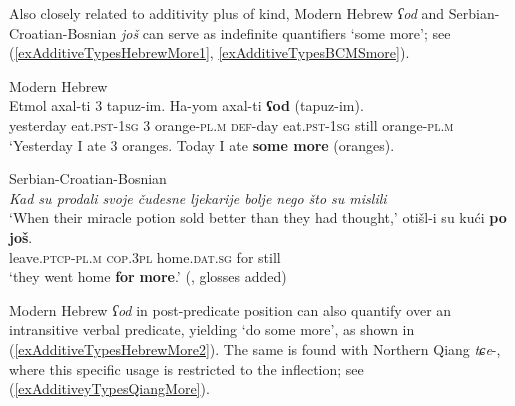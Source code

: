 Also closely related to additivity plus  of kind, Modern Hebrew \textit{ʕod} and Serbian-Croatian-Bosnian \textit{još} can serve as indefinite quantifiers \lq some more\rq{}; see (\ref{exAdditiveTypesHebrewMore1}, \ref{exAdditiveTypesBCMSmore}).

\begin{exe}
	\ex Modern Hebrew\label{exAdditiveTypesHebrewMore1}\\
	\gll Etmol axal-ti 3 tapuz-im. Ha-yom axal-ti \textbf{ʕod} \textup{(}tapuz-im\textup{)}.\\
	yesterday eat.\textsc{pst}-1\textsc{sg} 3 orange-\textsc{pl}.\textsc{m} \textsc{def}-day eat.\textsc{pst}-1\textsc{sg} still \phantom{(}orange-\textsc{pl}.\textsc{m}\\
	\glt \lq Yesterday I ate 3 oranges. Today I ate \textbf{some more} (oranges).
	\\\parencite[127]{Greenberg2012}

	\ex Serbian-Croatian-Bosnian\label{exAdditiveTypesBCMSmore}\\
	\textit{Kad su prodali svoje čudesne ljekarije bolje nego što su mislili}\\
	\lq When their miracle potion sold better than they had thought,\rq{}
	\exi{}\gll otišl-i su kući \textbf{po} \textbf{još}.\\
	leave.\textsc{ptcp}-\textsc{pl}.\textsc{m} \textsc{cop}.3\textsc{pl} home.\textsc{dat}.\textsc{sg} for still\\
	\glt \lq they went home \textbf{for} \textbf{more}.\rq{ }(\cite[s.v. \textit{još}]{HJP}, glosses added)
\end{exe}

Modern Hebrew \textit{ʕod} in post-predicate position can also quantify over an intransitive verbal predicate, yielding \lq do some more\rq{}, as shown in (\ref{exAdditiveTypesHebrewMore2}). The same is found with Northern Qiang \mbox{\textit{tɕe}-}, where this specific usage is restricted to the   inflection; see (\ref{exAdditiveyTypesQiangMore}).

